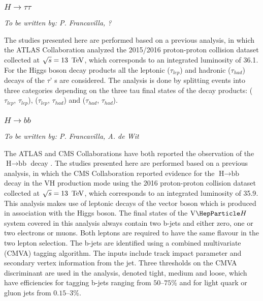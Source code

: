 


\subsubsection{$H \to \tau\tau$}
{\it To be written by: P. Francavilla, ?}

The studies presented here are performed based on a previous analysis, in which the ATLAS Collaboration analyzed the 2015/2016 proton-proton collision dataset collected at $\sqrt{s} = 13\,~\text{TeV}$, which corresponds to an integrated luminosity of 36.1\Uifb \cite{}. 
For the Higgs boson decay products all the leptonic ($\tau_{lep}$) and hadronic ($\tau_{had}$) decays of the $\tau$' s are considered. The analysis is done by splitting events into three categories depending on the three tau final states of the decay products: ($\tau_{lep}$, $\tau_{lep}$), ($\tau_{lep}$, $\tau_{had}$) and ($\tau_{had}$, $\tau_{had}$).



\subsubsection{$H \to bb$}
{\it To be written by: P. Francavilla, A. de Wit}

The ATLAS and CMS Collaborations have both reported the observation of the $\text{H}\to\text{bb}$ decay \cite{Aaboud:2018zhk,Sirunyan:2018kst}.
The studies presented here are performed based on a previous analysis, in which 
the CMS Collaboration reported evidence for the $\text{H}\to\text{bb}$ decay in the $\text{VH}$ production mode using the 2016
proton-proton collision dataset collected at $\sqrt{s} = 13\,~\text{TeV}$, which corresponds to an integrated luminosity of 35.9\Uifb \cite{HIG16044}. 
This analysis makes use of leptonic decays of the vector boson which is produced in association with the Higgs boson. The final states
of the $\vh$ system covered in this analysis always contain two b-jets and either zero, one or two electrons or muons. Both leptons are required to have the same flavour in the two lepton selection.
The b-jets are identified using a combined multivariate (CMVA) tagging algorithm. The inputs include track impact parameter and secondary vertex information from the jet. Three thresholds on the CMVA discriminant are used in the analysis, denoted tight, medium and loose, which have efficiencies for tagging b-jets ranging from $50$--$75\%$ and for light quark or gluon jets from $0.15$--$3\%$.

